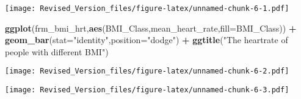 \documentclass[]{article}
\newenvironment{Shaded}{\begin{snugshade}}{\end{snugshade}}
\newcommand{\KeywordTok}[1]{\textcolor[rgb]{0.13,0.29,0.53}{\textbf{#1}}}
\newcommand{\DataTypeTok}[1]{\textcolor[rgb]{0.13,0.29,0.53}{#1}}
\newcommand{\StringTok}[1]{\textcolor[rgb]{0.31,0.60,0.02}{#1}}
\newcommand{\CommentTok}[1]{\textcolor[rgb]{0.56,0.35,0.01}{\textit{#1}}}
\newcommand{\OperatorTok}[1]{\textcolor[rgb]{0.81,0.36,0.00}{\textbf{#1}}}
\newcommand{\NormalTok}[1]{#1}
\begin{document}
\texttt{[image: Revised\_Version\_files/figure-latex/unnamed-chunk-6-1.pdf]}

\begin{Shaded}
\begin{Highlighting}[]
\KeywordTok{ggplot}\NormalTok{(frm_bmi_hrt,}\KeywordTok{aes}\NormalTok{(BMI_Class,mean_heart_rate,}\DataTypeTok{fill=}\NormalTok{BMI_Class)) }\OperatorTok{+}
\StringTok{  }\KeywordTok{geom_bar}\NormalTok{(}\DataTypeTok{stat=}\StringTok{"identity"}\NormalTok{,}\DataTypeTok{position=}\StringTok{"dodge"}\NormalTok{) }\OperatorTok{+}
\StringTok{  }\KeywordTok{ggtitle}\NormalTok{(}\StringTok{"The heartrate of people with different BMI"}\NormalTok{)}
\end{Highlighting}
\end{Shaded}

\texttt{[image: Revised\_Version\_files/figure-latex/unnamed-chunk-6-2.pdf]}

\begin{Shaded}
\end{Shaded}

\texttt{[image: Revised\_Version\_files/figure-latex/unnamed-chunk-6-3.pdf]}
\end{document}
